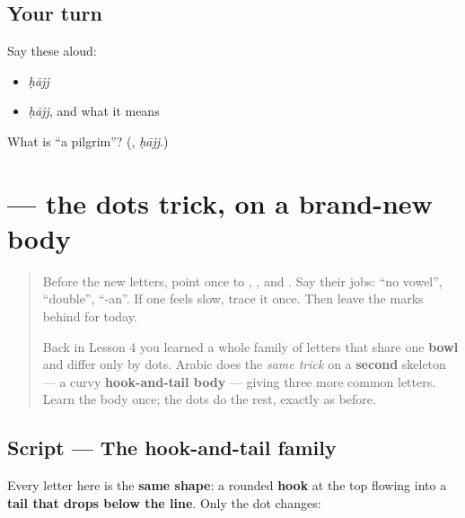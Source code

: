 \subsection*{Your turn}
Say these aloud:

\begin{itemize}
\raggedright
  \item \emph{ḥājj}
  \item \emph{ḥājj}, and what it means
\end{itemize}

\begin{tcolorbox}[breakable,colback=teal!4,colframe=teal!35!black,title={Before you move on}]
What is \textquotedblleft{}a pilgrim\textquotedblright{}? (\textbf{}, \emph{ḥājj}.)
\end{tcolorbox}
\section[\texorpdfstring{\ar{ح،} \ar{خ،} \ar{ج} (ḥāʾ, khāʾ, jīm)}{ح، خ، ج (ḥāʾ, khāʾ, jīm)}]{   — the dots trick, on a brand-new body}

\label{lesson:AR-W07-hook-family-ha-kha}



\begin{quote}
Before the new letters, point once to \textbf{}, \textbf{}, and \textbf{}. Say their jobs: “no vowel”, “double”, “-an”. If one feels slow, trace it once. Then leave the marks behind for today.

Back in Lesson 4 you learned a whole family of letters that share one \textbf{bowl} and differ only by dots. Arabic does the \emph{same trick} on a \textbf{second} skeleton — a curvy \textbf{hook-and-tail body} — giving three more common letters. Learn the body once; the dots do the rest, exactly as before.
\end{quote}

\subsection*{Script — The hook-and-tail family}

Every letter here is the \textbf{same shape}: a rounded \textbf{hook} at the top flowing into a \textbf{tail that drops below the line}. Only the dot changes:

